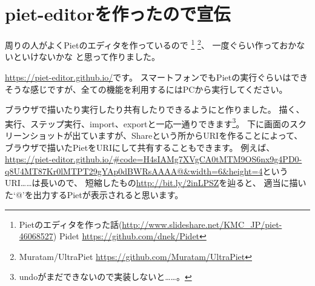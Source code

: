\chapter[piet-editorを作ったので宣伝]{piet-editorを作ったので宣伝}

周りの人がよくPietのエディタを作っているので
\footnote{Pietのエディタを作った話(\url{http://www.slideshare.net/KMC_JP/piet-46068527}) Pidet \url{https://github.com/dnek/Pidet}}
\footnote{Muratam/UltraPiet \url{https://github.com/Muratam/UltraPiet}}、
一度ぐらい作っておかないといけないかな と思って作りました。

\url{https://piet-editor.github.io/}です。
スマートフォンでもPietの実行ぐらいはできそうな感じですが、全ての機能を利用するにはPCから実行してください。

ブラウザで描いたり実行したり共有したりできるようにと作りました。
描く、実行、ステップ実行、import、exportと一応一通りできます\footnote{undoがまだできないので実装しないと……。}。
下に画面のスクリーンショットが出ていますが、Shareという所からURIを作ることによって、
ブラウザで描いたPietをURIにして共有することもできます。
例えば、\href{https://piet-editor.github.io/#code=H4sIAMg7XVgCA0tMTM9OS6nx9g4PD0-q8U4MT87Kr0lMTPT29gYAp0dBWRsAAAA@&width=6&height=4}{https://piet-editor.github.io/\#code=H4sIAMg7XVgCA0tMTM9OS6nx9g4PD0-q8U4MT87Kr0lMTPT29gYAp0dBWRsAAAA@\&width=6\&height=4}というURI……は長いので、
短縮したもの\url{http://bit.ly/2inLPSZ}を辿ると、
適当に描いた`@'を出力するPietが表示されると思います。

